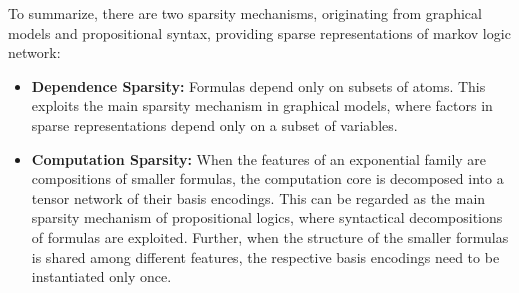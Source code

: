 


To summarize, there are two sparsity mechanisms, originating from graphical models and propositional syntax, providing sparse representations of markov logic network:
\begin{itemize}
    \item \textbf{Dependence Sparsity:} Formulas depend only on subsets of atoms.
    This exploits the main sparsity mechanism in graphical models, where factors in sparse representations depend only on a subset of variables.
    \item \textbf{Computation Sparsity:}
    When the features of an exponential family are compositions of smaller formulas, the computation core is decomposed into a tensor network of their basis encodings.
    This can be regarded as the main sparsity mechanism of propositional logics, where syntactical decompositions of formulas are exploited.
    Further, when the structure of the smaller formulas is shared among different features, the respective basis encodings need to be instantiated only once.
\end{itemize}



